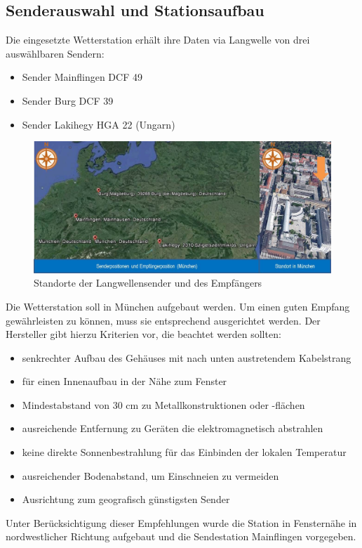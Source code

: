 \subsection{Senderauswahl und Stationsaufbau}
Die eingesetzte Wetterstation erhält ihre Daten via Langwelle von drei auswählbaren Sendern:
\begin{itemize}
\item Sender Mainflingen DCF 49
\item Sender Burg DCF 39
\item Sender Lakihegy HGA 22 (Ungarn)
\end{itemize}
\begin{figure}[h]
\centering
\includegraphics[scale=0.65]{weatherstation/Empfaengerausrichtung}
\caption{Standorte der Langwellensender und des Empfängers \cite{googleearth}}
\label{fig:senderlok}
\end{figure}
Die Wetterstation soll in München aufgebaut werden. Um einen guten Empfang gewährleisten zu können, muss sie entsprechend ausgerichtet werden. Der Hersteller gibt hierzu Kriterien vor, die beachtet werden sollten:
\begin{itemize}
\item senkrechter Aufbau des Gehäuses mit nach unten austretendem Kabelstrang
\item für einen Innenaufbau in der Nähe zum Fenster
\item Mindestabstand von 30 cm zu Metallkonstruktionen oder -flächen
\item ausreichende Entfernung zu Geräten die elektromagnetisch abstrahlen
\item keine direkte Sonnenbestrahlung für das Einbinden der lokalen Temperatur
\item ausreichender Bodenabstand, um Einschneien zu vermeiden
\item Ausrichtung zum geografisch günstigsten Sender
\end{itemize} 
Unter Berücksichtigung dieser Empfehlungen wurde die Station in Fensternähe in nordwestlicher Richtung aufgebaut und die Sendestation Mainflingen vorgegeben.
